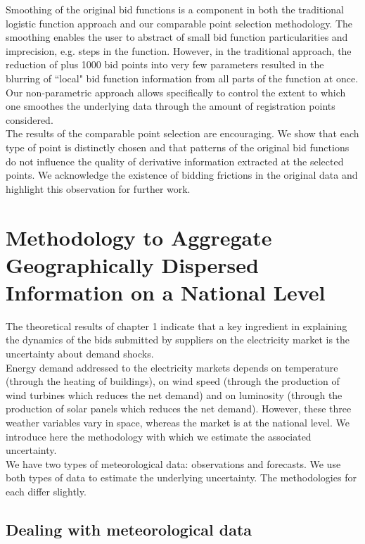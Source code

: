 Smoothing of the original bid functions is a component in both the traditional logistic function approach and our comparable point selection methodology. The smoothing enables the user to abstract of small bid function particularities and imprecision, e.g. steps in the function. However, in the traditional approach, the reduction of plus 1000 bid points into very few parameters resulted in the blurring of ``local" bid function information from all parts of the function at once. Our non-parametric approach allows specifically to control the extent to which one smoothes the underlying data through the amount of registration points considered.\\

The results of the comparable point selection are encouraging. We show that each type of point is distinctly chosen and that patterns of the original bid functions do not influence the quality of derivative information extracted at the selected points. We acknowledge the existence of bidding frictions in the original data and highlight this observation for further work. \\

\section{Methodology to Aggregate Geographically Dispersed Information on a National Level}
The theoretical results of chapter 1 indicate that a key ingredient in explaining the dynamics of the bids submitted by suppliers on the electricity market is the uncertainty about demand shocks. \\

Energy demand  addressed to the electricity markets depends on temperature (through the heating of buildings), on wind speed (through the production of wind turbines which reduces the net demand) and on luminosity (through the production of solar panels which reduces the net demand). However, these three weather variables vary in space, whereas the market is at the national level. We introduce here the methodology with which we estimate the associated uncertainty.\\  

We have two types of meteorological data: observations and forecasts. We use both types of data to estimate the underlying uncertainty. The methodologies for each differ slightly. \\
\subsection{Dealing with meteorological data}
